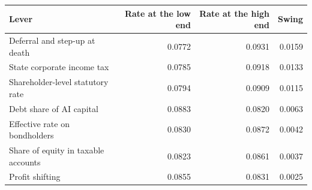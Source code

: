 \begin{tabular}{lrrr}
\toprule
Lever & Rate at the low end & Rate at the high end & Swing \\
\midrule
Deferral and step-up at death & 0.0772 & 0.0931 & 0.0159 \\
State corporate income tax & 0.0785 & 0.0918 & 0.0133 \\
Shareholder-level statutory rate & 0.0794 & 0.0909 & 0.0115 \\
Debt share of AI capital & 0.0883 & 0.0820 & 0.0063 \\
Effective rate on bondholders & 0.0830 & 0.0872 & 0.0042 \\
Share of equity in taxable accounts & 0.0823 & 0.0861 & 0.0037 \\
Profit shifting & 0.0855 & 0.0831 & 0.0025 \\
\bottomrule
\end{tabular}
